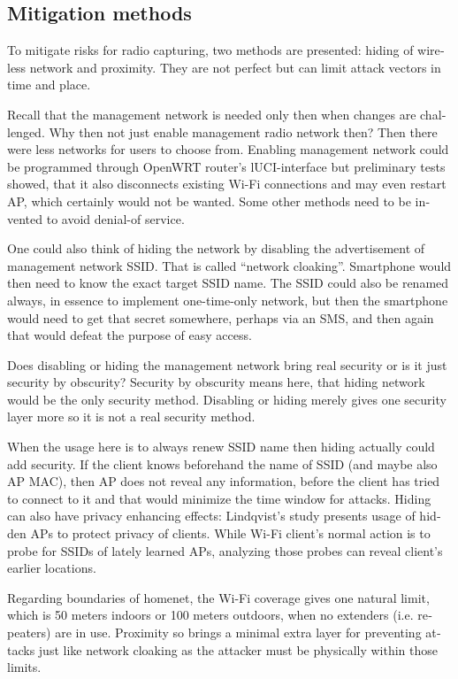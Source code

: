 \documentclass[12pt,a4paper,english]{tutthesis}
\begin{document}
\begin{otherlanguage}{english}
\subsection{Mitigation methods}
\label{sec-6-5-6}
To mitigate risks for radio capturing, two methods are presented: hiding of
wireless network and proximity. They are not perfect but can
limit attack vectors in time and place.


Recall that the management network is needed only then when changes
are challenged. Why then not just enable management radio network
then? Then there were less networks for users to choose from.
Enabling management network could be programmed through OpenWRT router's 
lUCI-interface but preliminary tests showed, that it also 
disconnects existing Wi-Fi connections and may even restart AP,
which certainly would not be wanted. Some other methods need to
be invented to avoid denial-of service.

\label{tag:hidessid}
One could also think of hiding the network by disabling the
advertisement of management network SSID. That is called ``network
cloaking''.  Smartphone would then need to know the exact target SSID name.
The SSID could also be renamed always, in essence
to implement one-time-only network, but then the smartphone would
need to get that secret somewhere, perhaps via an SMS, and then again
that would defeat the purpose of easy access.

Does disabling or hiding the management network bring real security or
is it just security by obscurity?  Security by obscurity means here,
that hiding network would be the only security method.
Disabling or hiding  merely gives one security layer more so it is not
a real security method.

When the usage here is to always renew SSID name then hiding actually
could add security. If the client knows beforehand the name of SSID
(and maybe also AP MAC), then AP does not reveal any information,
before the client has tried to connect to it and that would minimize
the time window for attacks.  Hiding can also have privacy enhancing
effects: Lindqvist's study \cite{hidden-wlan} presents usage of hidden
APs to protect privacy of clients. While Wi-Fi client's normal action is to
probe for SSIDs of lately learned APs, analyzing those probes can reveal client's
earlier locations.



Regarding boundaries of homenet, the Wi-Fi coverage gives 
one natural limit, which is 50 meters indoors or 100 meters outdoors,
when no extenders (i.e. repeaters) are in use.
Proximity so brings a minimal extra layer for preventing attacks
just like network cloaking as the attacker must be physically within those limits.



\end{otherlanguage}
\end{document}
